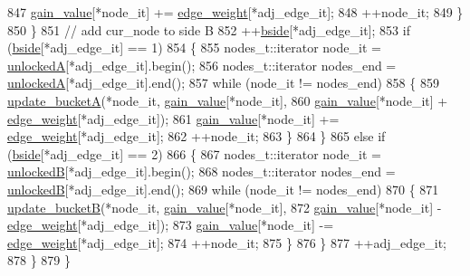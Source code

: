 \begin{DoxyCode}
847         \mbox{\hyperlink{classfm__partition_ae8176f4ce82305abfd58e519d2cdd91d}{gain\_value}}[*node\_it] += \mbox{\hyperlink{classfm__partition_adfe6147ba3f9c785f613b472f950595f}{edge\_weight}}[*adj\_edge\_it];
848         ++node\_it;
849         \}
850     \}
851     \textcolor{comment}{// add cur\_node to side B}
852     ++\mbox{\hyperlink{classfm__partition_aa75765887173fb06b076b6cae12d4e66}{bside}}[*adj\_edge\_it];
853     \textcolor{keywordflow}{if} (\mbox{\hyperlink{classfm__partition_aa75765887173fb06b076b6cae12d4e66}{bside}}[*adj\_edge\_it] == 1)
854     \{
855         nodes\_t::iterator node\_it = \mbox{\hyperlink{classfm__partition_a9d75a1d63f711a0c66ae7f5bc181cd8b}{unlockedA}}[*adj\_edge\_it].begin();
856         nodes\_t::iterator nodes\_end = \mbox{\hyperlink{classfm__partition_a9d75a1d63f711a0c66ae7f5bc181cd8b}{unlockedA}}[*adj\_edge\_it].end();
857         \textcolor{keywordflow}{while} (node\_it != nodes\_end)
858         \{
859         \mbox{\hyperlink{classfm__partition_aa4ec83c52916cc6cac23e7a9987427cd}{update\_bucketA}}(*node\_it, \mbox{\hyperlink{classfm__partition_ae8176f4ce82305abfd58e519d2cdd91d}{gain\_value}}[*node\_it],
860             \mbox{\hyperlink{classfm__partition_ae8176f4ce82305abfd58e519d2cdd91d}{gain\_value}}[*node\_it] + \mbox{\hyperlink{classfm__partition_adfe6147ba3f9c785f613b472f950595f}{edge\_weight}}[*adj\_edge\_it]);
861         \mbox{\hyperlink{classfm__partition_ae8176f4ce82305abfd58e519d2cdd91d}{gain\_value}}[*node\_it] += \mbox{\hyperlink{classfm__partition_adfe6147ba3f9c785f613b472f950595f}{edge\_weight}}[*adj\_edge\_it];
862         ++node\_it;
863         \}
864     \}
865     \textcolor{keywordflow}{else} \textcolor{keywordflow}{if} (\mbox{\hyperlink{classfm__partition_aa75765887173fb06b076b6cae12d4e66}{bside}}[*adj\_edge\_it] == 2)
866     \{
867         nodes\_t::iterator node\_it = \mbox{\hyperlink{classfm__partition_a74865bf3e6b6f73350c43c3ad9dfda96}{unlockedB}}[*adj\_edge\_it].begin();
868         nodes\_t::iterator nodes\_end = \mbox{\hyperlink{classfm__partition_a74865bf3e6b6f73350c43c3ad9dfda96}{unlockedB}}[*adj\_edge\_it].end();
869         \textcolor{keywordflow}{while} (node\_it != nodes\_end)
870         \{
871         \mbox{\hyperlink{classfm__partition_a270d469ca584ed9adff9fced67743679}{update\_bucketB}}(*node\_it, \mbox{\hyperlink{classfm__partition_ae8176f4ce82305abfd58e519d2cdd91d}{gain\_value}}[*node\_it],
872             \mbox{\hyperlink{classfm__partition_ae8176f4ce82305abfd58e519d2cdd91d}{gain\_value}}[*node\_it] - \mbox{\hyperlink{classfm__partition_adfe6147ba3f9c785f613b472f950595f}{edge\_weight}}[*adj\_edge\_it]);
873         \mbox{\hyperlink{classfm__partition_ae8176f4ce82305abfd58e519d2cdd91d}{gain\_value}}[*node\_it] -= \mbox{\hyperlink{classfm__partition_adfe6147ba3f9c785f613b472f950595f}{edge\_weight}}[*adj\_edge\_it];
874         ++node\_it;
875         \}
876     \}
877     ++adj\_edge\_it;
878     \}
879 \}
\end{DoxyCode}
